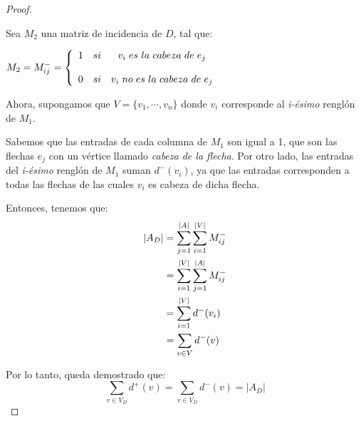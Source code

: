\documentclass{article}
\begin{document}
\begin{enumerate}
\begin{proof}
\begin{itemize}
      Sea $M_{2}$ una matriz de incidencia de $D$, tal que:
      \begin{center}
        $M_{2} = M^{-}_{ij}
        = \left \{
        \begin{array}{lcc}
          1 &   si  & v_{i} \hspace{0.3em} es \hspace{0.3em} la \hspace{0.3em}
          cabeza \hspace{0.3em} de \hspace{0.3em} e_{j} \\
          \\0 &  si & v_{i} \hspace{0.3em} no \hspace{0.3em} es \hspace{0.3em}
          la \hspace{0.3em} cabeza \hspace{0.3em} de \hspace{0.3em} e_{j}
        \end{array}
        \right.$
      \end{center}
      Ahora, supongamos que $V = \{v_{1}, \cdots, v_{n}\}$ donde $v_{i}$
      corresponde al \textit{i-\'esimo} rengl\'on de $M_{1}$.

      Sabemos que las entradas de cada columna de $M_{1}$ son igual a 1,
      que son las flechas $e_{j}$ con un v\'ertice llamado \textit{cabeza de la flecha}.
      Por otro lado, las entradas del \textit{i-ésimo} rengl\'on de $M_{1}$
      suman $d^{-}(v_{i})$, ya que las entradas corresponden a todas las
      flechas de las cuales $v_{i}$ es cabeza de dicha flecha.

      Entonces, tenemos que:
      \begin{equation*}
        \begin{split}
          \abs{A_{D}} & = \sum_{j=1}^{\abs{A}} \sum_{i=1}^{\abs{V}} M^{-}_{ij} \\
          & = \sum_{i=1}^{\abs{V}} \sum_{j=1}^{\abs{A}} M^{-}_{ij} \\
          & = \sum_{i=1}^{\abs{V}} d^{-}(v_{i}) \\
          & = \sum_{v \in V} d^{-}(v)
        \end{split}
      \end{equation*}
    \end{itemize}
    Por lo tanto, queda demostrado que:
    \[
    \displaystyle \sum_{v \in V_D} d^+(v) = \sum_{v \in V_D} d^-(v) = |A_D|
    \]
  \end{proof}


\end{enumerate}
\end{document}
